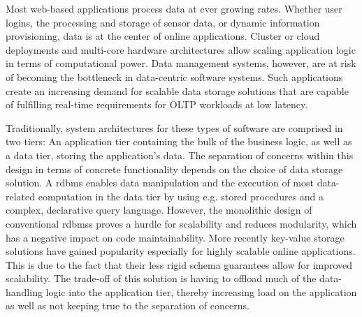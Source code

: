 
  Most web-based applications process data at ever growing rates.
  Whether user logins, the processing and storage of sensor data, or dynamic information provisioning, data is at the center of online applications.
  Cluster or cloud deployments and multi-core hardware architectures allow scaling application logic in terms of computational power.
  Data management systems, however, are at risk of becoming the bottleneck in data-centric software systems.
  Such applications create an increasing demand for scalable data storage solutions that are capable of fulfilling real-time requirements for OLTP workloads at low latency. %

  Traditionally, system architectures for these types of software are comprised in two tiers:
  An application tier containing the bulk of the business logic, as well as a data tier, storing the application's data.
  The separation of concerns within this design in terms of concrete functionality depends on the choice of data storage solution.
  A \gls{rdbms} enables data manipulation and the execution of most data-related computation in the data tier by using e.g. stored procedures and a complex, declarative query language.
  However, the monolithic design of conventional \glspl{rdbms} proves a hurdle for scalability and reduces modularity, which has a negative impact on code maintainability. %
  More recently key-value storage solutions have gained popularity especially for highly scalable online applications.
  This is due to the fact that their less rigid schema guarantees allow for improved scalability. %
  The trade-off of this solution is having to offload much of the data-handling logic into the application tier, thereby increasing load on the application as well as not keeping true to the separation of concerns.

